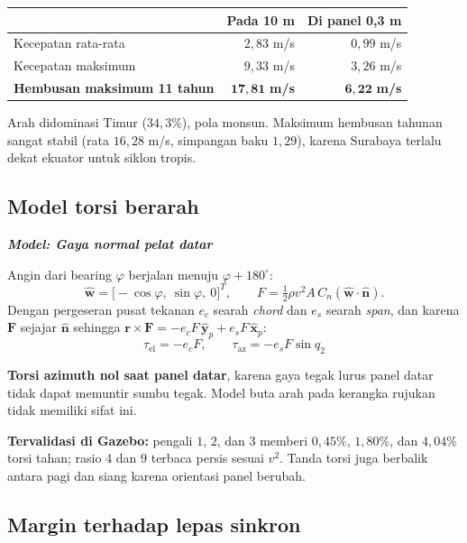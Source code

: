 \documentclass[11pt,a4paper]{article}
\newcommand{\nhat}{\hat{\bm{n}}}
\newcommand{\what}{\hat{\bm{w}}}
\newcommand{\xp}{\hat{\bm{x}}_p}
\newcommand{\yp}{\hat{\bm{y}}_p}
\newcommand{\degg}{^\circ}
\newcommand{\model}[1]{\textbf{\textit{Model: #1}}}
\begin{document}
\begin{longtable}{l r r}
\toprule
& \textbf{Pada 10 m} & \textbf{Di panel 0,3 m} \\
\midrule
Kecepatan rata-rata & $2{,}83$ m/s & $0{,}99$ m/s \\
Kecepatan maksimum & $9{,}33$ m/s & $3{,}26$ m/s \\
\textbf{Hembusan maksimum 11 tahun} & $\bm{17{,}81}$ \textbf{m/s} & $\bm{6{,}22}$ \textbf{m/s} \\
\bottomrule
\end{longtable}

Arah didominasi Timur ($34{,}3\%$), pola monsun. Maksimum hembusan tahunan sangat stabil (rata $16{,}28$ m/s,
simpangan baku $1{,}29$), karena Surabaya terlalu dekat ekuator untuk siklon tropis.

\subsection{Model torsi berarah}

\model{Gaya normal pelat datar}

Angin dari bearing $\varphi$ berjalan menuju $\varphi + 180\degg$:
\begin{equation}
\what = \big[ -\cos\varphi,\ \sin\varphi,\ 0 \big]^T,
\qquad
F = \tfrac{1}{2}\rho v^2 A\, C_n \left( \what \cdot \nhat \right).
\end{equation}
Dengan pergeseran pusat tekanan $e_c$ searah \emph{chord} dan $e_s$ searah \emph{span}, dan karena $\bm{F}$
sejajar $\nhat$ sehingga $\bm{r}\times\bm{F} = -e_c F\,\yp + e_s F\,\xp$:
\begin{equation}
\boxed{\;
\tau_{\mathrm{el}} = -e_c F, \qquad
\tau_{\mathrm{az}} = -e_s F \sin q_2 \; }
\label{eq:wind}
\end{equation}

\textbf{Torsi azimuth nol saat panel datar}, karena gaya tegak lurus panel datar tidak dapat memuntir sumbu
tegak. Model buta arah pada kerangka rujukan tidak memiliki sifat ini.

\textbf{Tervalidasi di Gazebo:} pengali $1$, $2$, dan $3$ memberi $0{,}45\%$, $1{,}80\%$, dan $4{,}04\%$
torsi tahan; rasio $4$ dan $9$ terbaca persis sesuai $v^2$. Tanda torsi juga berbalik antara pagi dan siang
karena orientasi panel berubah.

\subsection{Margin terhadap lepas sinkron}
\end{document}
